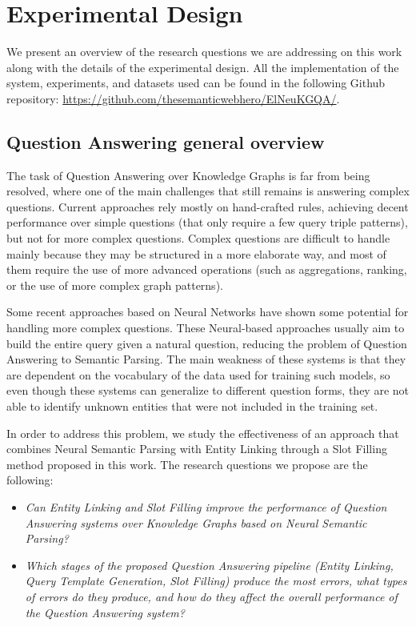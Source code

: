 \chapter{Experimental Design}
\label{cap4:experimentalDesign}
We present an overview of the research questions we are addressing on this work along with 
the details of the experimental design. All the implementation of the system, experiments, and 
datasets used can be found in the following Github repository: \url{https://github.com/thesemanticwebhero/ElNeuKGQA/}.

\section{Question Answering general overview}
\label{cap4:experimentalDesign/QaOverview}
The task of Question Answering over Knowledge Graphs is far from being resolved, where one of 
the main challenges that still remains is answering complex questions. Current approaches rely 
mostly on hand-crafted rules, achieving decent performance over simple questions (that only 
require a few query triple patterns), but not for more complex questions. Complex questions are 
difficult to handle mainly because they may be structured in a more elaborate way, and most of 
them require the use of more advanced \SPARQL{} operations (such as aggregations, ranking, or the 
use of more complex graph patterns).

Some recent approaches based on Neural Networks have shown some potential for handling more 
complex questions. These Neural-based approaches usually aim to build the entire \SPARQL{} query 
given a natural question, reducing the problem of Question Answering to Semantic Parsing. The 
main weakness of these systems is that they are dependent on the vocabulary of the data used 
for training such models, so even though these systems can generalize to different question 
forms, they are not able to identify unknown entities that were not included in the training set.

In order to address this problem, we study the effectiveness of an approach that combines Neural 
Semantic Parsing with Entity Linking through a Slot Filling method proposed in this work. The 
research questions we propose are the following:

\begin{itemize}
    \item \textit{Can Entity Linking and Slot Filling improve the performance of Question 
    Answering systems over Knowledge Graphs based on Neural Semantic Parsing?}
    \item \textit{Which stages of the proposed Question Answering pipeline (Entity Linking, 
    Query Template Generation, Slot Filling) produce the most errors, what types of errors do 
    they produce, and how do they affect the overall performance of the Question Answering system?}
\end{itemize}

